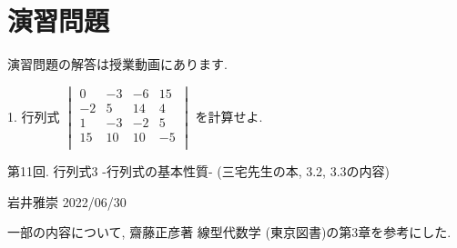 \documentclass[dvipdfmx,a4paper,11pt]{article}
\theoremstyle{definition}
\begin{document}
\section{演習問題}
演習問題の解答は授業動画にあります.

1. 行列式
$
\begin{vmatrix}
 0& -3& -6 &15 \\
 -2& 5& 14 &4 \\
 1& -3& -2 &5 \\
 15 & 10& 10 &-5 \\
 \end{vmatrix} 
 $
 を計算せよ.


\newpage

\begin{center}
{\Large 第11回. 行列式3 -行列式の基本性質- (三宅先生の本, 3.2, 3.3の内容)} 
\end{center}

\begin{flushright}
 岩井雅崇 2022/06/30
\end{flushright}

一部の内容について, 齋藤正彦著 線型代数学 (東京図書)の第3章を参考にした.

\end{document}
